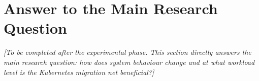 \section{Answer to the Main Research Question}

\textit{[To be completed after the experimental phase. This section directly answers the
main research question: how does system behaviour change and at what workload level is the
Kubernetes migration net beneficial?]}
